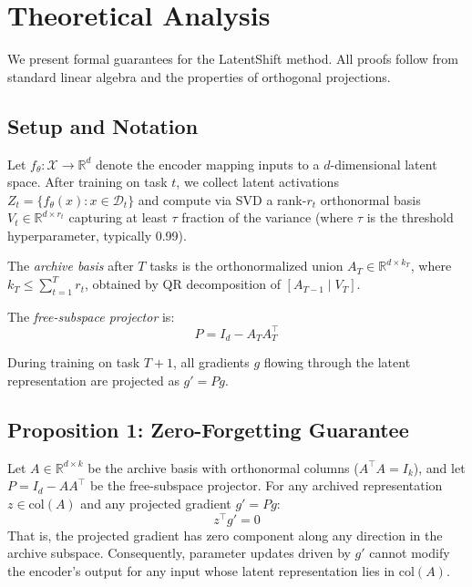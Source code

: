 
\section{Theoretical Analysis}
\label{sec:theory}

We present formal guarantees for the LatentShift method. All proofs follow
from standard linear algebra and the properties of orthogonal projections.

\subsection{Setup and Notation}

Let $f_\theta: \mathcal{X} \to \mathbb{R}^d$ denote the encoder mapping
inputs to a $d$-dimensional latent space. After training on task $t$, we
collect latent activations $Z_t = \{f_\theta(x) : x \in \mathcal{D}_t\}$
and compute via SVD a rank-$r_t$ orthonormal basis $V_t \in \mathbb{R}^{d \times r_t}$
capturing at least $\tau$ fraction of the variance (where $\tau$ is the
threshold hyperparameter, typically 0.99).

The \emph{archive basis} after $T$ tasks is the orthonormalized union
$A_T \in \mathbb{R}^{d \times k_T}$, where $k_T \leq \sum_{t=1}^T r_t$,
obtained by QR decomposition of $[A_{T-1} \mid V_T]$.

The \emph{free-subspace projector} is:
\begin{equation}
    P = I_d - A_T A_T^\top
    \label{eq:projector}
\end{equation}

During training on task $T+1$, all gradients $g$ flowing through the latent
representation are projected as $g' = Pg$.

\subsection{Proposition 1: Zero-Forgetting Guarantee}

\begin{proposition}
\label{prop:zero-forgetting}
Let $A \in \mathbb{R}^{d \times k}$ be the archive basis with orthonormal
columns ($A^\top A = I_k$), and let $P = I_d - AA^\top$ be the free-subspace
projector. For any archived representation $z \in \mathrm{col}(A)$ and any
projected gradient $g' = Pg$:
\begin{equation}
    z^\top g' = 0
\end{equation}
That is, the projected gradient has zero component along any direction in
the archive subspace. Consequently, parameter updates driven by $g'$
cannot modify the encoder's output for any input whose latent
representation lies in $\mathrm{col}(A)$.
\end{proposition}

